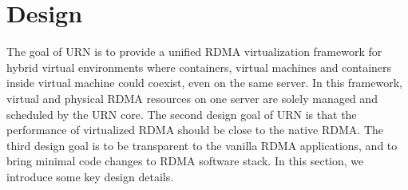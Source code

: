 

\section{Design}
The goal of URN is to provide a unified RDMA virtualization framework for hybrid virtual environments where containers, virtual machines and containers inside virtual machine could coexist, even on the same server. In this framework, virtual and physical RDMA resources on one server are solely managed and scheduled by the URN core. The second design goal of URN is that the performance of virtualized RDMA should be close to the native RDMA. The third design goal is to be transparent to the vanilla RDMA applications, and to bring minimal code changes to RDMA software stack. In this section, we introduce some key design details.


